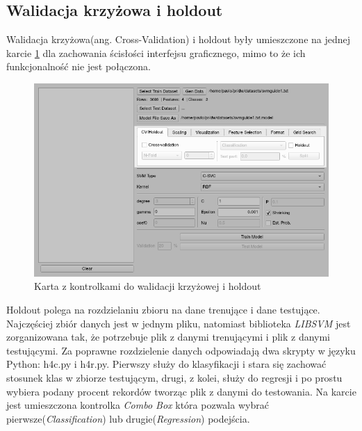 \documentclass[paper=a4, fontsize=11pt]{scrartcl} %
\numberwithin{equation}{section} %
\numberwithin{figure}{section} %
\begin{document}
\newpage
\subsection{Walidacja krzyżowa i holdout}
    \par Walidacja krzyżowa(ang. Cross-Validation) i holdout były umieszczone na jednej karcie
    \ref{fig:cv_holdout} dla zachowania ścisłości interfejsu graficznego, mimo to że ich
    funkcjonalność nie jest połączona.

    \begin{figure}[H]
        \begin{center}
            \includegraphics[scale=0.7]{./img/svm_app_cv_holdout.png}
            \caption{Karta z kontrolkami do walidacji krzyżowej i holdout}
            \label{fig:cv_holdout}
        \end{center}
    \end{figure}

    \par Holdout polega na rozdzielaniu zbioru na dane trenujące i dane testujące. Najczęściej
    zbiór danych jest w jednym pliku, natomiast biblioteka \textit{LIBSVM} jest zorganizowana
    tak, że potrzebuje plik z danymi trenującymi i plik z danymi testującymi. Za poprawne
    rozdzielenie danych odpowiadają dwa skrypty w języku Python: h4c.py i h4r.py. Pierwszy
    służy do klasyfikacji i stara się zachować stosunek klas w zbiorze testującym, drugi, z
    kolei, służy do regresji i po prostu wybiera podany procent rekordów tworząc plik z danymi
    do testowania. Na karcie jest umieszczona kontrolka \textit{Combo Box} która pozwala wybrać
    pierwsze(\textit{Classification}) lub drugie(\textit{Regression}) podejścia.
\end{document}
